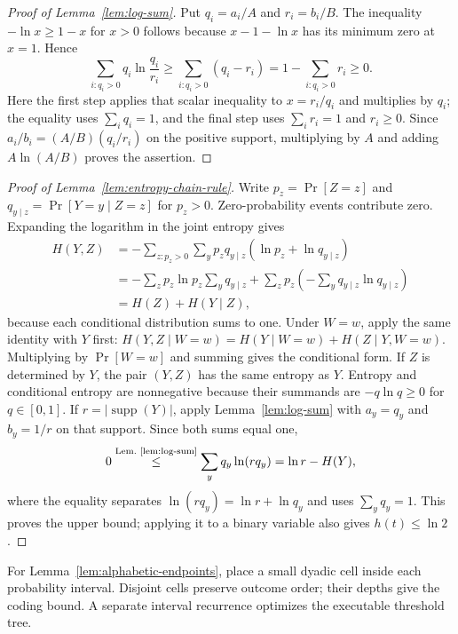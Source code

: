 \begin{proof}[Proof of Lemma~\ref{lem:log-sum}]
Put $q_i=a_i/A$ and $r_i=b_i/B$.
The inequality $-\ln x\ge1-x$ for $x>0$ follows because
$x-1-\ln x$ has its minimum zero at $x=1$. Hence
\[
 \sum_{i:q_i>0}q_i\ln\frac{q_i}{r_i}
 \ge\sum_{i:q_i>0}(q_i-r_i)
 =1-\sum_{i:q_i>0}r_i\ge0.
\]
Here the first step applies that scalar inequality to $x=r_i/q_i$
and multiplies by $q_i$; the equality uses $\sum_iq_i=1$,
and the final step uses $\sum_ir_i=1$ and $r_i\ge0$.
Since $a_i/b_i=(A/B)(q_i/r_i)$ on the positive support,
multiplying by $A$ and adding $A\ln(A/B)$ proves the assertion.
\end{proof}

\begin{proof}[Proof of Lemma~\ref{lem:entropy-chain-rule}]
Write $p_z=\Pr[Z=z]$ and $q_{y\mid z}=\Pr[Y=y\mid Z=z]$ for
$p_z>0$. Zero-probability events contribute zero. Expanding
the logarithm in the joint entropy gives
\[
\begin{aligned}
 H(Y,Z)
 &=-\sum_{z:p_z>0}\sum_y p_zq_{y\mid z}
                           (\ln p_z+\ln q_{y\mid z})\\
 &=-\sum_z p_z\ln p_z\sum_yq_{y\mid z}
       +\sum_zp_z\left(-\sum_yq_{y\mid z}\ln q_{y\mid z}\right)\\
 &=H(Z)+H(Y\mid Z),
\end{aligned}
\]
because each conditional distribution sums to one.
Under $W=w$, apply the same identity with $Y$ first:
$H(Y,Z\mid W=w)=H(Y\mid W=w)+H(Z\mid Y,W=w)$.
Multiplying by $\Pr[W=w]$ and summing gives the conditional form.
If $Z$ is determined
by $Y$, the pair $(Y,Z)$ has the same entropy as $Y$.
Entropy and conditional entropy are nonnegative because their
summands are $-q\ln q\ge0$ for $q\in[0,1]$.
If $r=|\operatorname{supp}(Y)|$, apply Lemma~\ref{lem:log-sum}
with $a_y=q_y$
and $b_y=1/r$ on that support. Since both sums equal one,
\[
 0\byref{Lem.}{lem:log-sum}{\le}\sum_yq_y\ln(rq_y)=\ln r-H(Y),
\]
where the equality separates $\ln(rq_y)=\ln r+\ln q_y$
and uses $\sum_yq_y=1$. This proves the upper bound; applying
it to a binary variable also gives $h(t)\le\ln2$.
\end{proof}

\begin{proofstrategy}
For Lemma~\ref{lem:alphabetic-endpoints}, place a small dyadic cell
inside each probability interval. Disjoint cells preserve outcome
order; their depths give the coding bound. A separate interval
recurrence optimizes the executable threshold tree.
\end{proofstrategy}

